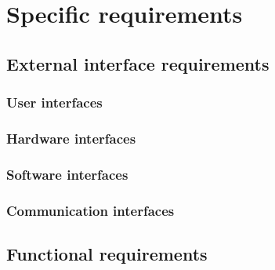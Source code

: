 \section{Specific requirements}

  \subsection{External interface requirements}
    \subsubsection{User interfaces}
    \label{sec:userinterfaces}
    \subsubsection{Hardware interfaces}
    \subsubsection{Software interfaces}
    \subsubsection{Communication interfaces}

  \subsection{Functional requirements}

